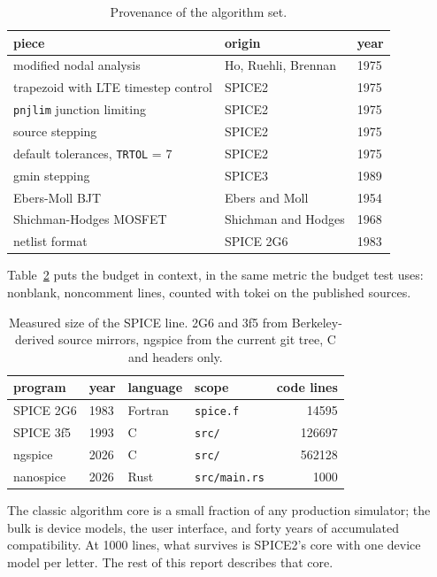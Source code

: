 \documentclass[11pt]{article}
\begin{document}
\begin{table}[H]
\centering
\begin{tabular}{lll}
\toprule
piece & origin & year \\
\midrule
modified nodal analysis & Ho, Ruehli, Brennan \cite{mna} & 1975 \\
trapezoid with LTE timestep control & SPICE2 \cite{spice2} & 1975 \\
\texttt{pnjlim} junction limiting & SPICE2 \cite{spice2} & 1975 \\
source stepping & SPICE2 \cite{spice2} & 1975 \\
default tolerances, \texttt{TRTOL} = 7 & SPICE2 \cite{spice2} & 1975 \\
gmin stepping & SPICE3 \cite{quarles} & 1989 \\
Ebers-Moll BJT & Ebers and Moll \cite{ebersmoll} & 1954 \\
Shichman-Hodges MOSFET & Shichman and Hodges \cite{shichman} & 1968 \\
netlist format & SPICE 2G6 & 1983 \\
\bottomrule
\end{tabular}
\caption{Provenance of the algorithm set.}
\label{tab:provenance}
\end{table}

Table~\ref{tab:loc} puts the budget in context, in the same metric the
budget test uses: nonblank, noncomment lines, counted with tokei on the
published sources.

\begin{table}[H]
\centering
\begin{tabular}{llllr}
\toprule
program & year & language & scope & code lines \\
\midrule
SPICE 2G6 & 1983 & Fortran & \texttt{spice.f} & 14595 \\
SPICE 3f5 & 1993 & C & \texttt{src/} & 126697 \\
ngspice & 2026 & C & \texttt{src/} & 562128 \\
nanospice & 2026 & Rust & \texttt{src/main.rs} & 1000 \\
\bottomrule
\end{tabular}
\caption{Measured size of the SPICE line. 2G6 and 3f5 from
Berkeley-derived source mirrors, ngspice from the current git tree,
C and headers only.}
\label{tab:loc}
\end{table}

The classic algorithm core is a small fraction of any production
simulator; the bulk is device models, the user interface, and forty
years of accumulated compatibility. At 1000 lines, what survives is
SPICE2's core with one device model per letter. The rest of this report
describes that core.
\end{document}
